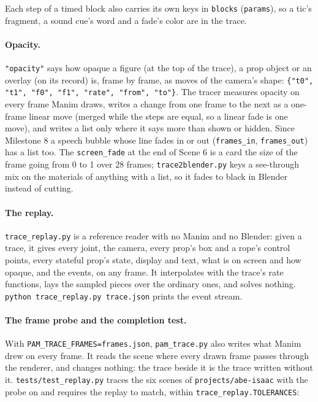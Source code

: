 \documentclass[
  12pt,
  letterpaper,
]{book}
\begin{document}
Each step of a timed block also carries its own keys in
\texttt{blocks} (\texttt{params}), so a tic's fragment, a sound cue's
word and a fade's color are in the trace.

\paragraph{Opacity.}
\texttt{"opacity"} says how opaque a figure (at the top of the trace),
a prop object or an overlay (on its record) is, frame by frame, as
moves of the camera's shape:
\texttt{\{"t0", "t1", "f0", "f1", "rate", "from", "to"\}}. The tracer
measures opacity on every frame Manim draws, writes a change from one
frame to the next as a one-frame linear move (merged while the steps
are equal, so a linear fade is one move), and writes a list only where
it says more than shown or hidden. Since Milestone 8 a speech bubble
whose line fades in or out (\texttt{frames\_in},
\texttt{frames\_out}) has a list too. The \texttt{screen\_fade} at the end
of Scene 6 is a card the size of the frame going from 0 to 1 over 28
frames; \texttt{trace2blender.py} keys a see-through mix on the
materials of anything with a list, so it fades to black in Blender
instead of cutting.

\paragraph{The replay.}
\texttt{trace\_replay.py} is a reference reader with no Manim and no
Blender: given a trace, it gives every joint, the camera, every prop's
box and a rope's control points, every stateful prop's state, display
and text, what is on screen and how opaque, and the events, on any
frame. It interpolates with the trace's rate functions, lays the
sampled pieces over the ordinary ones, and solves nothing.
\texttt{python trace\_replay.py trace.json} prints the event stream.

\paragraph{The frame probe and the completion test.}
With \texttt{PAM\_TRACE\_FRAMES=frames.json}, \texttt{pam\_trace.py}
also writes what Manim drew on every frame. It reads the scene where
every drawn frame passes through the renderer, and changes nothing:
the trace beside it is the trace written without it.
\texttt{tests/test\_replay.py} traces the six scenes of
\texttt{projects/abe-isaac} with the probe on and requires the replay
to match, within \texttt{trace\_replay.TOLERANCES}:
\end{document}
